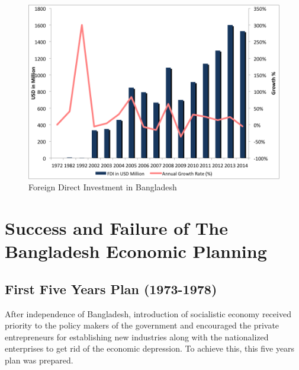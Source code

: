 \begin{figure}[h!]
    \centering
    \includegraphics[width=1.00\textwidth]{Figs/FDI.png}
    \caption{ Foreign Direct Investment in Bangladesh}
    \label{fig:mesh1}
\end{figure}


\newpage
\section{Success and Failure of The Bangladesh Economic Planning}

\subsection{First Five Years Plan (1973-1978)}
After independence of Bangladesh, introduction of socialistic economy received priority to
the policy makers of the government and encouraged the private entrepreneurs for establishing 
new industries along with the nationalized enterprises to get rid of the economic depression. 
To achieve this, this five years plan was prepared.

